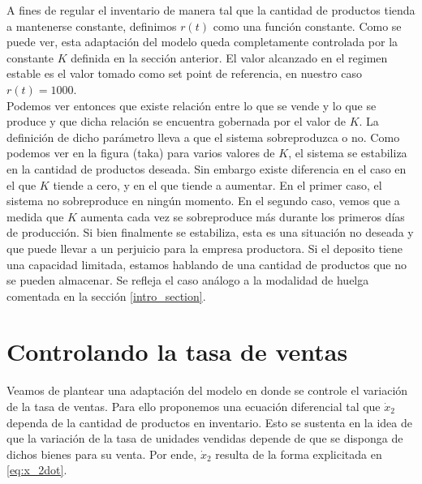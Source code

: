 \documentclass{sig-alternate}
\begin{document}
A fines de regular el inventario de manera tal que la cantidad de productos tienda a mantenerse constante, definimos $r(t)$ como una función
constante.
Como se puede ver, esta adaptación del modelo queda completamente controlada por la constante $K$ definida en la sección anterior.  El valor alcanzado en el regimen estable
es el valor tomado como set point de referencia, en nuestro caso $r(t) = 1000$.\\
Podemos ver entonces que existe relación entre lo que se vende y lo que se produce y que dicha relación se encuentra gobernada por el valor de
$K$. La definición de dicho parámetro lleva a que el sistema sobreproduzca o no. Como podemos ver en la figura (taka) para varios valores de $K$, 
el sistema se estabiliza en la cantidad de productos deseada. Sin embargo existe diferencia en el caso en el que $K$ tiende a cero, y en el que
tiende a aumentar. En el primer caso, el sistema no sobreproduce en ningún momento. En el segundo caso, vemos que a medida que $K$ aumenta
cada vez se sobreproduce más durante los primeros días de producción. Si bien finalmente se estabiliza, esta es una situación no deseada y
que puede llevar a un perjuicio para la empresa productora. Si el deposito tiene una capacidad limitada, estamos hablando de una cantidad
de productos que no se pueden almacenar. Se refleja el caso análogo a la modalidad de huelga comentada en la sección \ref{intro_section}.
    
\section{Controlando la tasa de ventas}
\label{salesrate_control_section}
Veamos de plantear una adaptación del modelo en donde se controle el variación de la tasa de ventas. Para ello proponemos una ecuación diferencial
tal que $\dot{x}_{2}$ dependa de la cantidad de productos en inventario. Esto se sustenta en la idea de que la variación de la tasa de unidades
vendidas depende de que se disponga de dichos bienes para su venta. Por ende, $\dot{x}_{2}$ resulta de la forma explicitada en \eqref{eq:x_2dot}.
\end{document}
